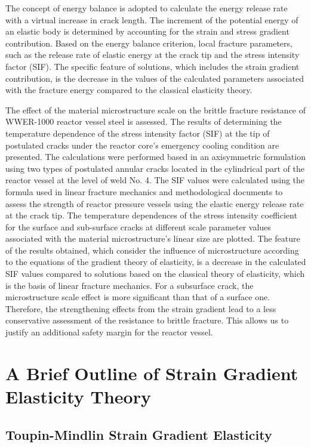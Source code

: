 The concept of energy balance is adopted to calculate the energy release rate with a virtual increase in crack length. The increment of the potential energy of an elastic body is determined by accounting for the strain and stress gradient contribution. Based on the energy balance criterion, local fracture parameters, such as the release rate of elastic energy at the crack tip and the stress intensity factor (SIF). The specific feature of solutions, which includes the strain gradient contribution, is the decrease in the values of the calculated parameters associated with the fracture energy compared to the classical elasticity theory. 

The effect of the material microstructure scale on the brittle fracture resistance of WWER-1000 reactor vessel steel is assessed. The results of determining the temperature dependence of the stress intensity factor (SIF) at the tip of postulated cracks under the reactor core's emergency cooling condition are presented. The calculations were performed based in an axisymmetric formulation using two types of postulated annular cracks located in the cylindrical part of the reactor vessel at the level of weld No. 4. The SIF values were calculated using the formula used in linear fracture mechanics and methodological documents to assess the strength of reactor pressure vessels using the elastic energy release rate at the crack tip. The temperature dependences of the stress intensity coefficient for the surface and sub-surface cracks at different scale parameter values associated with the material microstructure's linear size are plotted. The feature of the results obtained, which consider the influence of microstructure according to the equations of the gradient theory of elasticity, is a decrease in the calculated SIF values compared to solutions based on the classical theory of elasticity, which is the basis of linear fracture mechanics. For a subsurface crack, the microstructure scale effect is more significant than that of a surface one. Therefore, the strengthening effects from the strain gradient lead to a less conservative assessment of the resistance to brittle fracture. This allows us to justify an additional safety margin for the reactor vessel.

\section{A Brief Outline of Strain Gradient Elasticity Theory}

\subsection{Toupin-Mindlin Strain Gradient Elasticity}

